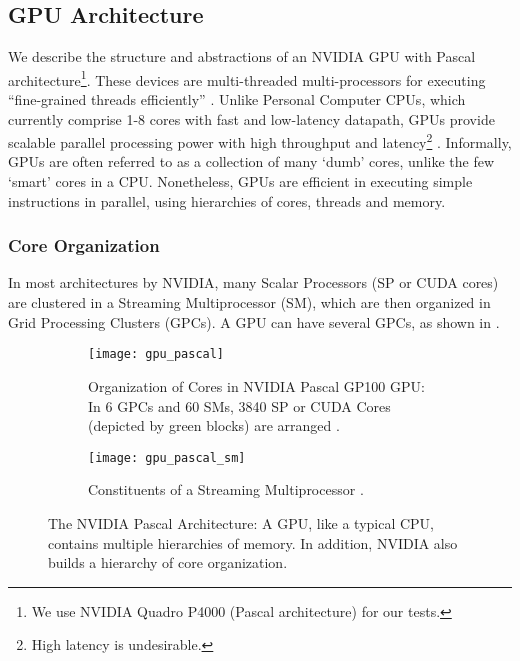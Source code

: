 \subsection{GPU Architecture} \label{sec:GPU Architecture}
We describe the structure and abstractions of an NVIDIA GPU with Pascal architecture\footnote{We use NVIDIA Quadro P4000 (Pascal architecture) for our tests.}. These devices are multi-threaded multi-processors for executing ``fine-grained threads efficiently'' \cite[Appendix~B.4]{PattersonARM}. Unlike Personal Computer CPUs, which currently comprise 1-8 cores with fast and low-latency datapath, GPUs provide scalable parallel processing power with high throughput and latency\footnote{High latency is undesirable.} \cite{PattersonARM, DemystifyingGPU}. Informally, GPUs are often referred to as a collection of many `dumb' cores, unlike the few `smart' cores in a CPU. Nonetheless, GPUs are efficient in executing simple instructions in parallel, using hierarchies of cores, threads and memory.

\subsubsection{Core Organization}
In most architectures by NVIDIA, many Scalar Processors (SP or CUDA cores) are clustered in a Streaming Multiprocessor (SM), which are then organized in Grid Processing Clusters (GPCs). A GPU can have several GPCs, as shown in  \cite{CUDADocs,ParallelNVIDIA,DemystifyingGPU}.
\begin{figure}
    \centering
    \begin{subfigure}{\textwidth}
        \centering
        \texttt{[image: gpu\_pascal]}
        \caption[Organization of Cores in NVIDIA Pascal GP100 GPU]{Organization of Cores in NVIDIA Pascal GP100 GPU: In 6 GPCs and 60 SMs, 3840 SP or CUDA Cores (depicted by green blocks) are arranged \cite{ParallelNVIDIA,PascalWhitepaper}.}
        \label{fig:Organization of Cores in NVIDIA Pascal GP100 GPU}
    \end{subfigure}\vspace*{1em}
    \begin{subfigure}{\textwidth}
        \centering
        \texttt{[image: gpu\_pascal\_sm]}
        \caption[Constituents of a Streaming Multiprocessor]{Constituents of a Streaming Multiprocessor \cite{ParallelNVIDIA,PascalWhitepaper}.}
        \label{fig:Constituents of a Streaming Multiprocessor}
    \end{subfigure}
    \caption[The NVIDIA Pascal Architecture]{The NVIDIA Pascal Architecture: A GPU, like a typical CPU, contains multiple hierarchies of memory. In addition, NVIDIA also builds a hierarchy of core organization.}
    \label{fig:The NVIDIA Pascal Architecture}
\end{figure}

